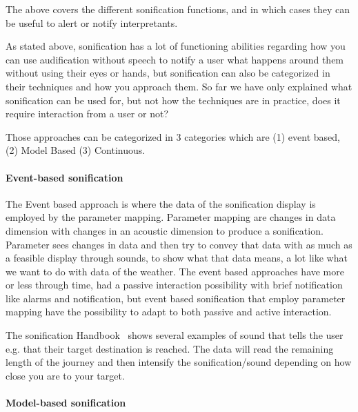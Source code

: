 
The above covers the different sonification functions, and in which cases they can be useful to alert or notify interpretants.

As stated above, sonification has a lot of functioning abilities regarding how you can use audification without speech to notify a user what happens around them without using their eyes or hands, but sonification can also be categorized in their techniques and how you approach them. 
So far we have only explained what sonification can be used for, but not how the techniques are in practice, does it require interaction from a user or not?

Those approaches can be categorized in 3 categories which are (1) event based, (2) Model Based (3) Continuous.


\paragraph{Event-based sonification} %
\label{par:event_based_sonification}

The Event based approach is where the data of the sonification display is employed by the parameter mapping. 
Parameter mapping are changes in data dimension with changes in an acoustic dimension to produce a sonification. 
Parameter sees changes in data and then try to convey that data with as much as a feasible display through sounds, to show what that data means, a lot like what we want to do with data of the weather. 
The event based approaches have more or less through time, had a passive interaction possibility with brief notification like alarms and notification, but event based sonification that employ parameter mapping have the possibility to adapt to both passive and active interaction.

The sonification Handbook~\cite[Ch. 15]{Hermann2011} shows several examples of sound that tells the user e.g. that their target destination is reached.
The data will read the remaining length of the journey and then intensify the sonification/sound depending on how close you are to your target.



\paragraph{Model-based sonification} %
\label{par:analysis_model_based_sonification}

